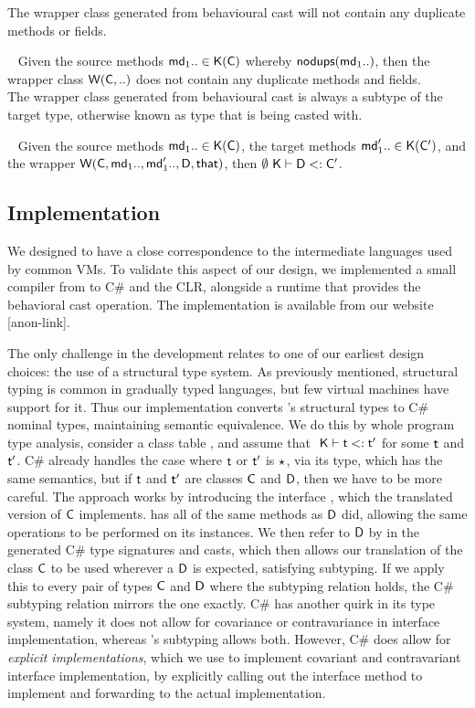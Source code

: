 \documentclass[acmlarge, anonymous, authordraft, review]{acmart} %
\begin{document}
The wrapper class generated from behavioural cast will not contain
any duplicate methods or fields.

\medskip{} ~
Given the source methods $\md[1].. \In \App\K\C$ whereby $\cload{\md[1]..}$, 
then the wrapper class $\wrapE{\C, ..}$ does not contain 
any duplicate methods and fields.\\

The wrapper class generated from behavioural cast is always a subtype
of the target type, otherwise known as type that is being casted with.

\medskip{} ~
Given the source methods $\md[1].. \In \App\K\C$, the target methods $\mdp[1].. \In \App\K\Cp$, 
and the wrapper $\wrap\C{\md[1]..}{\mdp[1]..}\D\that $, then $\StrSub\emptyset\K\D\Cp$.



\subsection{Implementation}

We designed \kafka to have a close correspondence to the intermediate
languages used by common VMs. To validate this aspect of our design, we
implemented a small compiler from \kafka to C\# and the CLR, alongside a
runtime that provides the behavioral cast operation. The implementation is
available from our website [anon-link].

The only challenge in the development relates to one of our earliest design
choices: the use of a structural type system. As previously mentioned,
structural typing is common in gradually typed languages, but few virtual
machines have support for it. Thus our implementation converts \kafka's
structural types to C\# nominal types, maintaining semantic equivalence.  We
do this by whole program type analysis, consider a class table \K, and
assume that $\StrSub{}\K\t\tp$ for some $\t$ and $\tp$. C\# already handles
the case where $\t$ or $\tp$ is $\star$, via its  type, which has
the same semantics, but if $\t$ and $\tp$ are classes $\C$ and $\D$, then we
have to be more careful. The approach works by introducing the interface
, which the translated version of $\C$ implements.  has all of
the same methods as $\D$ did, allowing the same operations to be performed
on its instances. We then refer to $\D$ by  in the generated C\# type
signatures and casts, which then allows our translation of the class $\C$ to
be used wherever a $\D$ is expected, satisfying subtyping. If we apply this
to every pair of types $\C$ and $\D$ where the subtyping relation holds, the
C\# subtyping relation mirrors the \kafka one exactly.  C\# has another
quirk in its type system, namely it does not allow for covariance or
contravariance in interface implementation, whereas \kafka's subtyping
allows both. However, C\# does allow for \emph{explicit implementations},
which we use to implement covariant and contravariant interface
implementation, by explicitly calling out the interface method to implement
and forwarding to the actual implementation.
\end{document}
